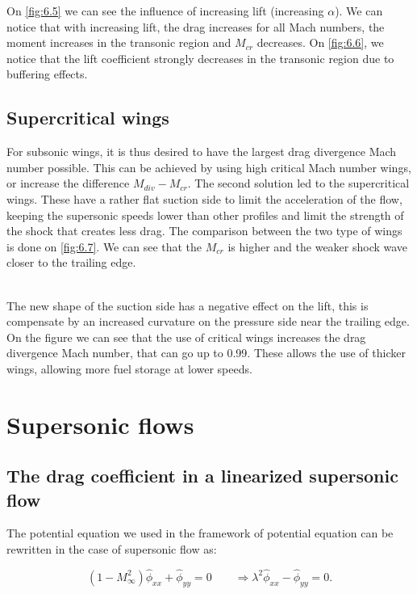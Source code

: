 	On \autoref{fig:6.5} we can see the influence of increasing lift (increasing $\alpha$). We can notice that with increasing lift, the drag increases for all Mach numbers, the moment increases in the transonic region and $M_{cr}$ decreases. On \autoref{fig:6.6}, we notice that the lift coefficient strongly decreases in the transonic region due to buffering effects. 
	
\subsection{Supercritical wings}
	For subsonic wings, it is thus desired to have the largest drag divergence Mach number possible. This can be achieved by using high critical Mach number wings, or increase the difference  $M_{div} -M_{cr}$. The second solution led to the supercritical wings. These have a rather flat suction side to limit the acceleration of the flow, keeping the supersonic speeds lower than other profiles and limit the strength of the shock that creates less drag. The comparison between the two type of wings is done on \autoref{fig:6.7}. We can see that the $M_{cr}$ is higher and the weaker shock wave closer to the trailing edge. 
	
	\ \\ The new shape of the suction side has a negative effect on the lift, this is compensate by an increased curvature on the pressure side near the trailing edge. On the figure we can see that the use of critical wings increases the drag divergence Mach number, that can go up to 0.99. These allows the use of thicker wings, allowing more fuel storage at lower speeds. 
	
\section{Supersonic flows}
	\subsection{The drag coefficient in a linearized supersonic flow}
	The potential equation we used in the framework of potential equation can be rewritten in the case of supersonic flow as:
	
	\begin{equation}
		(1-M_\infty^2) \hat{\phi}_{xx} + \hat{\phi}_{yy} = 0 \qquad \Rightarrow \lambda ^2 \hat{\phi} _{xx} - \hat{\phi} _{yy} = 0.
	\end{equation}
	
